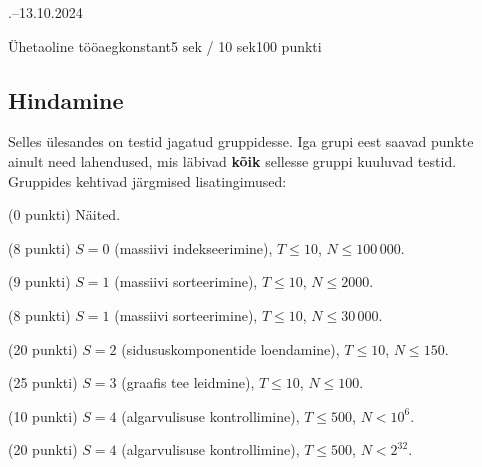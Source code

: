 \documentclass[a4paper,11pt]{article}
\begin{document}
\begin{ol}{\eio}{.--13.10.2024}{\yle}{}
\begin{yl}{7}{Ühetaoline tööaeg}{konstant}{5 sek / 10 sek}{100 punkti}
	\subsection*{Hindamine}

	Selles ülesandes on testid jagatud gruppidesse. Iga grupi eest saavad punkte
	ainult need lahendused, mis läbivad \textbf{kõik} sellesse gruppi kuuluvad
	testid. Gruppides kehtivad järgmised lisatingimused:
	\begin{xenum}
		\item (0 punkti) Näited.
		\item (8 punkti) $S = 0$ (massiivi indekseerimine), $T \le 10$, $N \le 100\,000$.
		\item (9 punkti) $S = 1$ (massiivi sorteerimine), $T \le 10$, $N \le 2000$.
		\item (8 punkti) $S = 1$ (massiivi sorteerimine), $T \le 10$, $N \le 30\,000$.
		\item (20 punkti) $S = 2$ (sidususkomponentide loendamine), $T \le 10$, $N \le 150$.
		\item (25 punkti) $S = 3$ (graafis tee leidmine), $T \le 10$, $N \le 100$.
		\item (10 punkti) $S = 4$ (algarvulisuse kontrollimine), $T \le 500$, $N < 10^6$.
		\item (20 punkti) $S = 4$ (algarvulisuse kontrollimine), $T \le 500$, $N < 2^{32}$.
\end{xenum}

\end{yl}
\end{ol}
\end{document}
